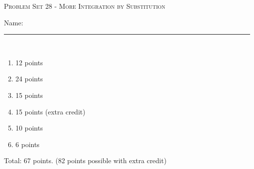 \documentclass{article}
\begin{document}
\begin{center}
  \large\textsc{Problem Set 28 - More Integration by Substitution}
  
      \pspace{12pt}
  \begin{problemonly}\large Name: \rule{5cm}{0.15mm}\\ \end{problemonly}
\end{center}

\begin{grading}
  \begin{enumerate}
    \item 12 points
    \item 24 points
    \item 15 points
    \item 15 points (extra credit)
    \item 10 points
    \item 6 points
\end{enumerate}
Total: 67 points. (82 points possible with extra credit) 
\end{grading}
\end{document}
